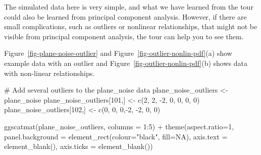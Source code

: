 \documentclass[
  letterpaper,
]{krantz}
\newenvironment{Shaded}{\begin{snugshade}}{\end{snugshade}}
\newcommand{\AttributeTok}[1]{\textcolor[rgb]{0.40,0.45,0.13}{#1}}
\newcommand{\CommentTok}[1]{\textcolor[rgb]{0.37,0.37,0.37}{#1}}
\newcommand{\ConstantTok}[1]{\textcolor[rgb]{0.56,0.35,0.01}{#1}}
\newcommand{\DecValTok}[1]{\textcolor[rgb]{0.68,0.00,0.00}{#1}}
\newcommand{\FunctionTok}[1]{\textcolor[rgb]{0.28,0.35,0.67}{#1}}
\newcommand{\NormalTok}[1]{\textcolor[rgb]{0.00,0.23,0.31}{#1}}
\newcommand{\OtherTok}[1]{\textcolor[rgb]{0.00,0.23,0.31}{#1}}
\newcommand{\SpecialCharTok}[1]{\textcolor[rgb]{0.37,0.37,0.37}{#1}}
\newcommand{\StringTok}[1]{\textcolor[rgb]{0.13,0.47,0.30}{#1}}
\begin{document}
The simulated data here is very simple, and what we have learned from
the tour could also be learned from principal component analysis.
However, if there are small complications, such as outliers or nonlinear
relationships, that might not be visible from principal component
analysis, the tour can help you to see them.

Figure~\ref{fig-plane-noise-outlier} and
Figure~\ref{fig-outlier-nonlin-pdf}(a) show example data with an outlier
and Figure~\ref{fig-outlier-nonlin-pdf}(b) shows data with non-linear
relationships.

\begin{Shaded}
\begin{Highlighting}[]
\CommentTok{\# Add several outliers to the plane\_noise data}
\NormalTok{plane\_noise\_outliers }\OtherTok{\textless{}{-}}\NormalTok{ plane\_noise}
\NormalTok{plane\_noise\_outliers[}\DecValTok{101}\NormalTok{,] }\OtherTok{\textless{}{-}} \FunctionTok{c}\NormalTok{(}\DecValTok{2}\NormalTok{, }\DecValTok{2}\NormalTok{, }\SpecialCharTok{{-}}\DecValTok{2}\NormalTok{, }\DecValTok{0}\NormalTok{, }\DecValTok{0}\NormalTok{, }\DecValTok{0}\NormalTok{, }\DecValTok{0}\NormalTok{)}
\NormalTok{plane\_noise\_outliers[}\DecValTok{102}\NormalTok{,] }\OtherTok{\textless{}{-}} \FunctionTok{c}\NormalTok{(}\DecValTok{0}\NormalTok{, }\DecValTok{0}\NormalTok{, }\DecValTok{0}\NormalTok{,}\SpecialCharTok{{-}}\DecValTok{2}\NormalTok{, }\SpecialCharTok{{-}}\DecValTok{2}\NormalTok{, }\DecValTok{0}\NormalTok{, }\DecValTok{0}\NormalTok{)}

\FunctionTok{ggscatmat}\NormalTok{(plane\_noise\_outliers, }\AttributeTok{columns =} \DecValTok{1}\SpecialCharTok{:}\DecValTok{5}\NormalTok{) }\SpecialCharTok{+}
  \FunctionTok{theme}\NormalTok{(}\AttributeTok{aspect.ratio=}\DecValTok{1}\NormalTok{,}
    \AttributeTok{panel.background =} 
          \FunctionTok{element\_rect}\NormalTok{(}\AttributeTok{colour=}\StringTok{"black"}\NormalTok{, }\AttributeTok{fill=}\ConstantTok{NA}\NormalTok{),}
    \AttributeTok{axis.text =} \FunctionTok{element\_blank}\NormalTok{(),}
    \AttributeTok{axis.ticks =} \FunctionTok{element\_blank}\NormalTok{())}
\end{Highlighting}
\end{Shaded}
\end{document}
